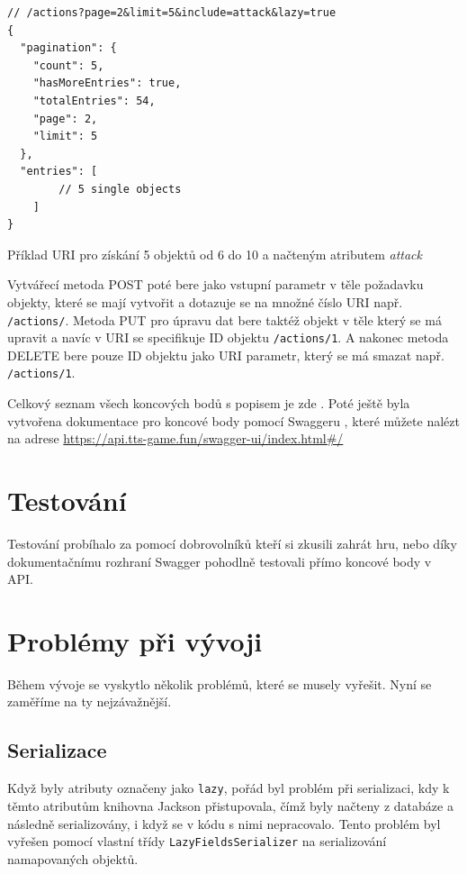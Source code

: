 \begin{listing}[H]
    \begin{verbatim}
// /actions?page=2&limit=5&include=attack&lazy=true
{
  "pagination": {
    "count": 5,
    "hasMoreEntries": true,
    "totalEntries": 54,
    "page": 2,
    "limit": 5
  },
  "entries": [ 
        // 5 single objects
    ]
}
    \end{verbatim}
    \caption{Příklad URI pro získání 5 objektů od 6 do 10 a načteným atributem \textit{attack}}
    \label{code:action:endpoint:multiple}
\end{listing}

Vytvářecí metoda POST poté bere jako vstupní parametr v těle požadavku objekty, které se mají vytvořit a dotazuje se na množné číslo URI např. \texttt{/actions/}. Metoda PUT pro úpravu dat bere taktéž objekt v těle který se má upravit a navíc v URI se specifikuje ID objektu \texttt{/actions/1}. A nakonec metoda DELETE bere pouze ID objektu jako URI parametr, který se má smazat např. \texttt{/actions/1}.

Celkový seznam všech koncových bodů s popisem je zde . Poté ještě byla vytvořena dokumentace pro koncové body pomocí Swaggeru , které můžete nalézt na adrese \url{https://api.tts-game.fun/swagger-ui/index.html#/}


\section{Testování}\label{sec:testing}
Testování probíhalo za pomocí dobrovolníků kteří si zkusili zahrát hru, nebo díky dokumentačnímu rozhraní Swagger  pohodlně testovali přímo koncové body v API.



\section{Problémy při vývoji}\label{sec:impl:problems}
Během vývoje se vyskytlo několik problémů, které se musely vyřešit. Nyní se zaměříme na ty nejzávažnější.

\subsection{Serializace}
Když byly atributy označeny jako \texttt{lazy}, pořád byl problém při serializaci, kdy k těmto atributům knihovna Jackson přistupovala, čímž byly načteny z databáze a následně serializovány, i když se v kódu s nimi nepracovalo. Tento problém byl vyřešen pomocí vlastní třídy \texttt{LazyFieldsSerializer}
na serializování namapovaných objektů. 

